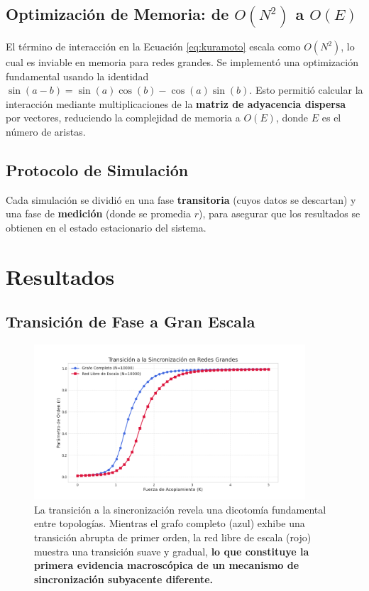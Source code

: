 \documentclass[12pt, a4paper]{article}
\begin{document}
\subsection{Optimización de Memoria: de \(O(N^2)\) a \(O(E)\)}
El término de interacción en la Ecuación \ref{eq:kuramoto} escala como \(O(N^2)\), lo cual es inviable en memoria para redes grandes. Se implementó una optimización fundamental usando la identidad \(\sin(a-b) = \sin(a)\cos(b) - \cos(a)\sin(b)\). Esto permitió calcular la interacción mediante multiplicaciones de la \textbf{matriz de adyacencia dispersa} por vectores, reduciendo la complejidad de memoria a \(O(E)\), donde \(E\) es el número de aristas.

\subsection{Protocolo de Simulación}
Cada simulación se dividió en una fase \textbf{transitoria} (cuyos datos se descartan) y una fase de \textbf{medición} (donde se promedia \(r\)), para asegurar que los resultados se obtienen en el estado estacionario del sistema.

\section{Resultados}

\subsection{Transición de Fase a Gran Escala}
\begin{figure}[H]
    \centering
    \includegraphics[width=0.9\textwidth]{img/1.png}
    \caption{La transición a la sincronización revela una dicotomía fundamental entre topologías. Mientras el grafo completo (azul) exhibe una transición abrupta de primer orden, la red libre de escala (rojo) muestra una transición suave y gradual, \textbf{lo que constituye la primera evidencia macroscópica de un mecanismo de sincronización subyacente diferente.}}
    \label{fig:r\_vs\_k}
\end{figure}
\end{document}
